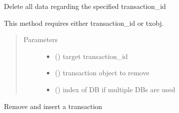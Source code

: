 \documentclass[letterpaper,10pt,english]{sphinxmanual}
\begin{document}
\begin{fulllineitems}
\begin{fulllineitems}
\end{fulllineitems}


\begin{fulllineitems}
\label{\detokenize{bbc1.core.data_handler:bbc1.core.data_handler.DataHandler.remove}}
Delete all data regarding the specified transaction\_id

This method requires either transaction\_id or txobj.
\begin{quote}\begin{description}
\item[{Parameters}] \leavevmode\begin{itemize}
\item {} 
 () \textendash{} target transaction\_id

\item {} 
 ({\hyperref[\detokenize{bbc1.core.bbclib:bbc1.core.bbclib.BBcTransaction}]{}}) \textendash{} transaction object to remove

\item {} 
 () \textendash{} index of DB if multiple DBs are used

\end{itemize}

\end{description}\end{quote}

\end{fulllineitems}


\begin{fulllineitems}
\label{\detokenize{bbc1.core.data_handler:bbc1.core.data_handler.DataHandler.restore_transaction_data}}
Remove and insert a transaction

\end{fulllineitems}


\end{fulllineitems}
\end{document}
